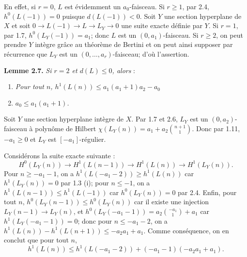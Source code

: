 
En
effet, si \(r=0\), \(L\) est évidemment un \(a_0\)-faisceau. Si \(r\ge1\), par 2.4, \(h^0(L(-1))=0\) puisque \(d(L(-1))<0\). Soit \(Y\) une section hyperplane de \(X\) et soit \(0\longrightarrow L(-1)\longrightarrow L\longrightarrow L_Y\longrightarrow0\) une suite exacte définie par \(Y\). Si \(r=1\), par 1.7, \(h^0(L_Y(-1))=a_1\); donc \(L\) est un \((0,a_1)\)-faisceau. Si \(r\ge2\), on peut prendre \(Y\) intègre grâce au théorème de Bertini et on peut ainsi supposer par récurrence que \(L_Y\) est un \((0,\ldots,a_r)\)-faisceau; d'où l'assertion.

\textbf{Lemme 2.7.} \emph{Si \(r=2\) et \(d(L)\le0\), alors} :
\begin{enumerate}[label=(\roman*)]
\item \emph{Pour tout \(n\), \(h^1(L(n))\le a_1(a_1+1)a_2-a_0\)}
\item \emph{\(a_0\le a_1(a_1+1)\).}
\end{enumerate}

Soit \(Y\) une section hyperplane intègre de \(X\). Par 1.7 et 2.6, \(L_Y\) est un \((0,a_2)\)-faisceau à polynôme de Hilbert \(\chi(L_Y(n))=a_1+a_2\binom{n+1}{1}\). Donc par 1.11, \(-a_1\ge0\) et \(L_Y\) est \([-a_1]\)-régulier.

Considérons la suite exacte suivante :
\[
H^0(L_Y(n))\longrightarrow H^1(L(n-1))
\longrightarrow H^1(L(n))\longrightarrow H^1(L_Y(n)).
\]
Pour \(n\ge -a_1-1\), on a \(h^1(L(-a_1-2))\ge h^1(L(n))\) car \(h^1(L_Y(n))=0\) par 1.3 (i); pour \(n\le -1\), on a \(h^1(L(n-1))\le h^1(L(-1))\) car \(h^0(L_Y(n))=0\) par 2.4. Enfin, pour tout \(n\), \(h^0(L_Y(n-1))\le h^0(L_Y(n))\) car il existe une injection \(L_Y(n-1)\longrightarrow L_Y(n)\), et \(h^0(L_Y(-a_1-1))=a_2\binom{-a_1}{1}+a_1\) car \(h^1(L_Y(-a_1-1))=0\); donc pour \(n\le -a_1-2\), on a \(h^1(L(n))-h^1(L(n+1))\le -a_2a_1+a_1\). Comme conséquence, on en conclut que pour tout \(n\),
\[
h^1(L(n))\le h^1(L(-a_1-2))+(-a_1-1)(-a_2a_1+a_1).
\tag{2.7.1}
\]

